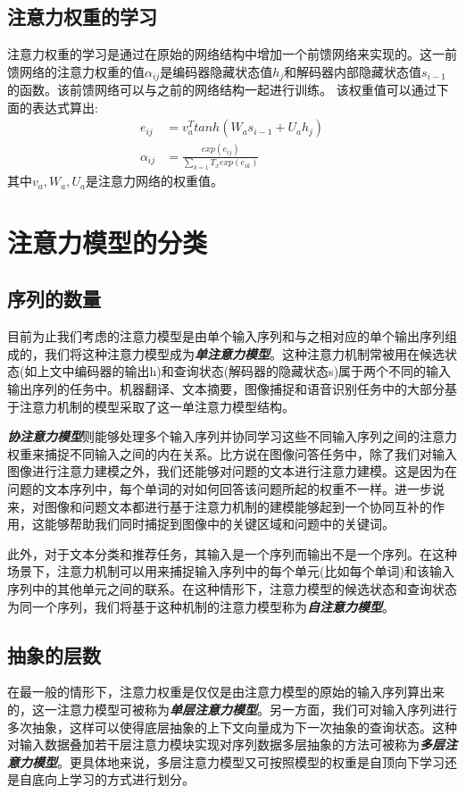 \documentclass{ctexart}
\begin{document}
\subsection{注意力权重的学习}
注意力权重的学习是通过在原始的网络结构中增加一个前馈网络来实现的。这一前馈网络的注意力权重的值$\alpha_{ij}$是编码器隐藏状态值$h_j$和解码器内部隐藏状态值$s_{i-1}$的函数。该前馈网络可以与之前的网络结构一起进行训练。
该权重值可以通过下面的表达式算出:
\begin{align*}
e_{ij} &= v_a^Ttanh(W_as_{i-1}+U_ah_j)\\
\alpha_{ij} &= \frac{exp(e_{ij})}{\sum_{k=1}{T_x}exp(e_{ik})} 
\end{align*}
其中$v_a,W_a,U_a$是注意力网络的权重值。
\section{注意力模型的分类}
\subsection{序列的数量}
目前为止我们考虑的注意力模型是由单个输入序列和与之相对应的单个输出序列组成的，我们将这种注意力模型成为\textit{\textbf{单注意力模型}}。这种注意力机制常被用在候选状态(如上文中编码器的输出h)和查询状态(解码器的隐藏状态s)属于两个不同的输入输出序列的任务中。机器翻译、文本摘要，图像捕捉和语音识别任务中的大部分基于注意力机制的模型采取了这一单注意力模型结构。


\textit{\textbf{协注意力模型}}则能够处理多个输入序列并协同学习这些不同输入序列之间的注意力权重来捕捉不同输入之间的内在关系。比方说在图像问答任务中，除了我们对输入图像进行注意力建模之外，我们还能够对问题的文本进行注意力建模。这是因为在问题的文本序列中，每个单词的对如何回答该问题所起的权重不一样。进一步说来，对图像和问题文本都进行基于注意力机制的建模能够起到一个协同互补的作用，这能够帮助我们同时捕捉到图像中的关键区域和问题中的关键词。


此外，对于文本分类和推荐任务，其输入是一个序列而输出不是一个序列。在这种场景下，注意力机制可以用来捕捉输入序列中的每个单元(比如每个单词)和该输入序列中的其他单元之间的联系。在这种情形下，注意力模型的候选状态和查询状态为同一个序列，我们将基于这种机制的注意力模型称为\textit{\textbf{自注意力模型}}。
\subsection{抽象的层数}
在最一般的情形下，注意力权重是仅仅是由注意力模型的原始的输入序列算出来的，这一注意力模型可被称为\textit{\textbf{单层注意力模型}}。另一方面，我们可对输入序列进行多次抽象，这样可以使得底层抽象的上下文向量成为下一次抽象的查询状态。这种对输入数据叠加若干层注意力模块实现对序列数据多层抽象的方法可被称为\textit{\textbf{多层注意力模型}}。更具体地来说，多层注意力模型又可按照模型的权重是自顶向下学习还是自底向上学习的方式进行划分。
\end{document}
